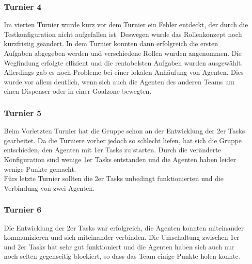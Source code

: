 \subsubsection{Turnier 4}
Im vierten Turnier wurde kurz vor dem Turnier ein Fehler entdeckt, der durch die Testkonfiguration nicht aufgefallen ist. Deswegen wurde das Rollenkonzept noch kurzfristig geändert. In dem Turnier konnten dann erfolgreich die ersten Aufgaben abgegeben werden und verschiedene Rollen wurden angenommen. Die Wegfindung erfolgte effizient und die rentabelsten Aufgaben wurden ausgewählt. Allerdings gab es noch Probleme bei einer lokalen Anhäufung von Agenten. Dies wurde vor allem deutlich, wenn sich auch die Agenten des anderen Teams um einen Dispenser oder in einer Goalzone bewegten.

\subsubsection{Turnier 5}
Beim Vorletzten Turnier hat die Gruppe schon an der Entwicklung der 2er Tasks gearbeitet. Da die Turniere vorher jedoch so schlecht liefen, hat sich die Gruppe entschieden, den Agenten mit 1er Tasks zu starten. Durch die veränderte Konfiguration sind wenige 1er Tasks entstanden und die Agenten haben leider wenige Punkte gemacht. \\
Fürs letzte Turnier sollten die 2er Tasks unbedingt funktionierten und die Verbindung von zwei Agenten.

\subsubsection{Turnier 6}
Die Entwicklung der 2er Tasks war erfolgreich, die Agenten konnten miteinander kommunizieren und sich miteinander verbinden. Die Umschaltung zwischen 1er und 2er Tasks hat sehr gut funktioniert und die Agenten haben sich auch nur noch selten gegenseitig blockiert, so dass das Team einige Punkte holen konnte. 

